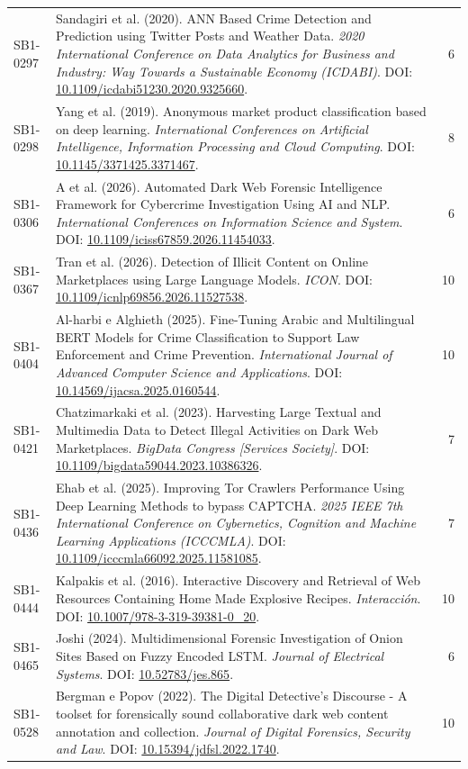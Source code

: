 \begin{small}
\begin{longtable}{lp{11.2cm}r}
SB1-0297 & Sandagiri et al. (2020). ANN Based Crime Detection and Prediction using Twitter Posts and Weather Data. \textit{2020 International Conference on Data Analytics for Business and Industry: Way Towards a Sustainable Economy (ICDABI)}. DOI: \url{10.1109/icdabi51230.2020.9325660}. & 6 \\
SB1-0298 & Yang et al. (2019). Anonymous market product classification based on deep learning. \textit{International Conferences on Artificial Intelligence, Information Processing and Cloud Computing}. DOI: \url{10.1145/3371425.3371467}. & 8 \\
SB1-0306 & A et al. (2026). Automated Dark Web Forensic Intelligence Framework for Cybercrime Investigation Using AI and NLP. \textit{International Conferences on Information Science and System}. DOI: \url{10.1109/iciss67859.2026.11454033}. & 6 \\
SB1-0367 & Tran et al. (2026). Detection of Illicit Content on Online Marketplaces using Large Language Models. \textit{ICON}. DOI: \url{10.1109/icnlp69856.2026.11527538}. & 10 \\
SB1-0404 & Al-harbi e Alghieth (2025). Fine-Tuning Arabic and Multilingual BERT Models for Crime Classification to Support Law Enforcement and Crime Prevention. \textit{International Journal of Advanced Computer Science and Applications}. DOI: \url{10.14569/ijacsa.2025.0160544}. & 10 \\
SB1-0421 & Chatzimarkaki et al. (2023). Harvesting Large Textual and Multimedia Data to Detect Illegal Activities on Dark Web Marketplaces. \textit{BigData Congress [Services Society]}. DOI: \url{10.1109/bigdata59044.2023.10386326}. & 7 \\
SB1-0436 & Ehab et al. (2025). Improving Tor Crawlers Performance Using Deep Learning Methods to bypass CAPTCHA. \textit{2025 IEEE 7th International Conference on Cybernetics, Cognition and Machine Learning Applications (ICCCMLA)}. DOI: \url{10.1109/icccmla66092.2025.11581085}. & 7 \\
SB1-0444 & Kalpakis et al. (2016). Interactive Discovery and Retrieval of Web Resources Containing Home Made Explosive Recipes. \textit{Interacción}. DOI: \url{10.1007/978-3-319-39381-0_20}. & 10 \\
SB1-0465 & Joshi (2024). Multidimensional Forensic Investigation of Onion Sites Based on Fuzzy Encoded LSTM. \textit{Journal of Electrical Systems}. DOI: \url{10.52783/jes.865}. & 6 \\
SB1-0528 & Bergman e Popov (2022). The Digital Detective's Discourse - A toolset for forensically sound collaborative dark web content annotation and collection. \textit{Journal of Digital Forensics, Security and Law}. DOI: \url{10.15394/jdfsl.2022.1740}. & 10 \\

\end{longtable}
\end{small}
